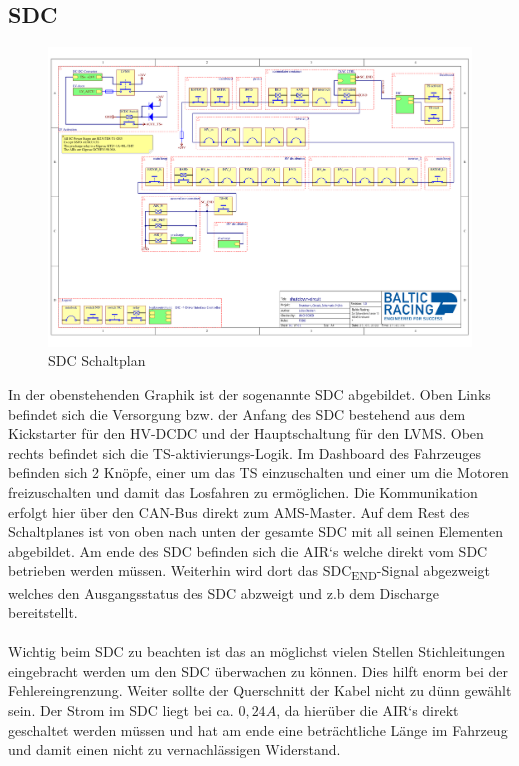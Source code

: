 \subsection{\ac{SDC}}
\begin{figure}[h]
	\centering
	\includegraphics[width=1\linewidth]{bilder/Shutdowncircuit}
	\caption{\ac{SDC} Schaltplan}
	\label{fig:shutdowncircuit}
\end{figure}

In der obenstehenden Graphik ist der sogenannte \ac{SDC} abgebildet. Oben Links befindet sich die Versorgung bzw. der Anfang des \ac{SDC} bestehend aus dem Kickstarter für den \ac{HV}-DCDC und der Hauptschaltung für den \ac{LVMS}. Oben rechts befindet sich die \ac{TS}-aktivierungs-Logik. Im Dashboard des Fahrzeuges befinden sich 2 Knöpfe, einer um das \ac{TS} einzuschalten und einer um die Motoren freizuschalten und damit das Losfahren zu ermöglichen. Die Kommunikation erfolgt hier über den \ac{CAN}-Bus direkt zum \ac{AMS}-Master. Auf dem Rest des Schaltplanes ist von oben nach unten der gesamte \ac{SDC} mit all seinen Elementen abgebildet. Am ende des \ac{SDC} befinden sich die \ac{AIR}`s welche direkt vom \ac{SDC} betrieben werden müssen. Weiterhin wird dort das \ac{SDC}\textsubscript{END}-Signal abgezweigt welches den Ausgangsstatus des \ac{SDC} abzweigt und z.b dem Discharge bereitstellt.\\
\\
Wichtig beim \ac{SDC} zu beachten ist das an möglichst vielen Stellen Stichleitungen eingebracht werden um den \ac{SDC} überwachen zu können. Dies hilft enorm bei der Fehlereingrenzung. Weiter sollte der Querschnitt der Kabel nicht zu dünn gewählt sein. Der Strom im \ac{SDC} liegt bei ca. \ensuremath{0,24 A}, da hierüber die \ac{AIR}`s direkt geschaltet werden müssen und hat am ende eine beträchtliche Länge im Fahrzeug und damit einen nicht zu vernachlässigen Widerstand. 
\FloatBarrier
